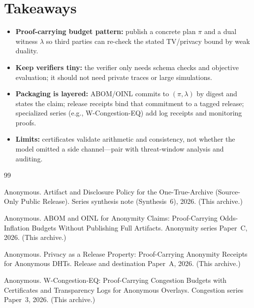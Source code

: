 \documentclass[11pt]{article}
\begin{document}
\section{Takeaways}
\begin{itemize}[leftmargin=*]
\item \textbf{Proof-carrying budget pattern:} publish a concrete plan $\pi$ and a dual witness $\lambda$ so third parties can re-check the stated TV/privacy bound by weak duality.
\item \textbf{Keep verifiers tiny:} the verifier only needs schema checks and objective evaluation; it should not need private traces or large simulations.
\item \textbf{Packaging is layered:} ABOM/OINL commits to $(\pi,\lambda)$ by digest and states the claim; release receipts bind that commitment to a tagged release; specialized series (e.g., W-Congestion-EQ) add log receipts and monitoring proofs.
\item \textbf{Limits:} certificates validate arithmetic and consistency, not whether the model omitted a side channel---pair with threat-window analysis and auditing.
\end{itemize}

\begin{thebibliography}{99}\small

Anonymous.
\newblock Artifact and Disclosure Policy for the One-True-Archive (Source-Only Public Release).
\newblock Series synthesis note (Synthesis~6), 2026. (This archive.)

Anonymous.
\newblock ABOM and OINL for Anonymity Claims: Proof-Carrying Odds-Inflation Budgets Without Publishing Full Artifacts.
\newblock Anonymity series Paper~C, 2026. (This archive.)

Anonymous.
\newblock Privacy as a Release Property: Proof-Carrying Anonymity Receipts for Anonymous DHTs.
\newblock Release and destination Paper~A, 2026. (This archive.)

Anonymous.
\newblock W-Congestion-EQ: Proof-Carrying Congestion Budgets with Certificates and Transparency Logs for Anonymous Overlays.
\newblock Congestion series Paper~3, 2026. (This archive.)

\end{thebibliography}
\end{document}
